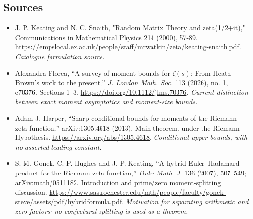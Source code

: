 \documentclass[11pt,a4paper]{article}
\numberwithin{equation}{section}
\begin{document}
\subsection{Sources}
\begin{itemize}\raggedright
\item[\textnormal{[S1]}]\hypertarget{source:statement:1}{} J. P. Keating and N. C. Snaith, "Random Matrix Theory and zeta(1/2+it)," Communications in Mathematical Physics 214 (2000), 57-89.
\url{https://empslocal.ex.ac.uk/people/staff/mrwatkin/zeta/keating-snaith.pdf}.
{\small\textit{Catalogue formulation source.}}
\item[\textnormal{[E1]}]\hypertarget{extra:statement:1}{} Alexandra Florea, ``A survey of moment bounds for $\zeta(s)$: From Heath-Brown's work to the present,'' \emph{J. London Math. Soc.} 113 (2026), no. 1, e70376. Sections 1--3.
\url{https://doi.org/10.1112/jlms.70376}.
{\small\textit{Current distinction between exact moment asymptotics and moment-size bounds.}}
\item[\textnormal{[E2]}]\hypertarget{extra:statement:2}{} Adam J. Harper, ``Sharp conditional bounds for moments of the Riemann zeta function,'' arXiv:1305.4618 (2013). Main theorem, under the Riemann Hypothesis.
\url{https://arxiv.org/abs/1305.4618}.
{\small\textit{Conditional upper bounds, with no asserted leading constant.}}
\item[\textnormal{[E3]}]\hypertarget{extra:statement:3}{} S. M. Gonek, C. P. Hughes and J. P. Keating, ``A hybrid Euler--Hadamard product for the Riemann zeta function,'' \emph{Duke Math. J.} 136 (2007), 507--549; arXiv:math/0511182. Introduction and prime/zero moment-splitting discussion.
\url{https://www.sas.rochester.edu/mth/people/faculty/gonek-steve/assets/pdf/hybridformula.pdf}.
{\small\textit{Motivation for separating arithmetic and zero factors; no conjectural splitting is used as a theorem.}}
\end{itemize}
\end{document}
